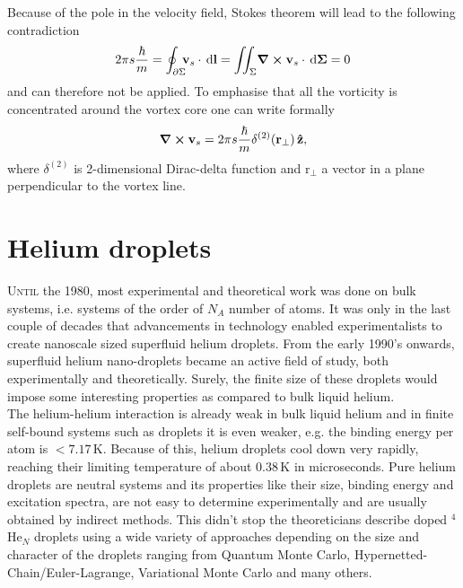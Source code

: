 \documentclass[12pt,a4paper]{book}
\renewcommand{\vec}[1]{\bm{\mathrm{#1}}}
\newcommand{\unit}[1]{\,\mathrm{#1}}
\begin{document}
			Because of the pole in the velocity field, Stokes theorem will lead to the following contradiction
			\begin{align}
				2\pi s\frac{\hbar}{m}=\oint_{\partial\Sigma}\!\!\!\vec{v}_s\cdot\unit{d}\vec{l} = \iint_{\Sigma}\!\curl{\vec{v}_s}\cdot\unit{d}\vec{\Sigma} = 0
			\end{align}
			and can therefore not be applied. To emphasise that all the vorticity is concentrated around the vortex core one can write formally
			\begin{align}
				\curl{\vec{v}_s} = 2\pi s\frac{\hbar}{m}\delta^{(2)}(\vec{r}_\perp)\,\vu{z},
			\end{align}
			where $\delta^{(2)}$ is 2-dimensional Dirac-delta function and $\vec{r}_\perp$ a vector in a plane perpendicular to the vortex line.\\

	\section{Helium droplets}
		\lettrine[lines=3,findent=3pt,nindent=0pt]{U}{ntil} the 1980, most experimental and theoretical work was done on bulk systems, i.e. systems of the order of $N_A$ number of atoms. It was only in the last couple of decades that advancements in technology enabled experimentalists to create nanoscale sized superfluid helium droplets. From the early 1990's onwards, superfluid helium nano-droplets became an active field of study, both experimentally and theoretically. Surely, the finite size of these droplets would impose some interesting properties as compared to bulk liquid helium.\\
		
		The helium-helium interaction is already weak in bulk liquid helium and in finite self-bound systems such as droplets it is even weaker, e.g. the binding energy per atom is $<\!7.17\unit{K}$. Because of this, helium droplets cool down very rapidly, reaching their limiting temperature of about $0.38\unit{K}$ in microseconds. Pure helium droplets are neutral systems and its properties like their size, binding energy and excitation spectra, are not easy to determine experimentally and are usually obtained by indirect methods. This didn't stop the theoreticians describe doped $^4$He$_N$ droplets using a wide variety of approaches depending on the size and character of the droplets ranging from Quantum Monte Carlo, Hypernetted-Chain/Euler-Lagrange, Variational Monte Carlo and many others.\\
	
\end{document}
